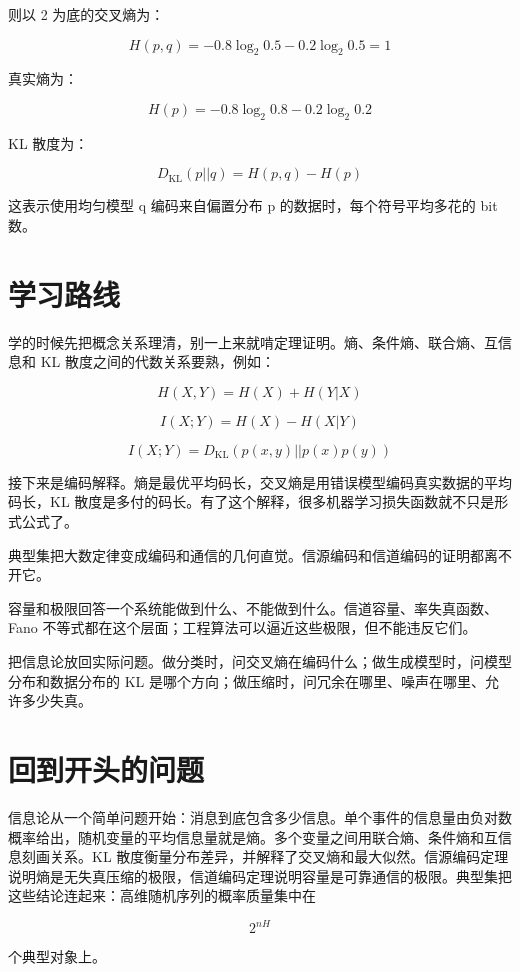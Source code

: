 则以 2 为底的交叉熵为：

\[
H(p,q)=-0.8\log_2 0.5-0.2\log_2 0.5=1
\]

真实熵为：

\[
H(p)=-0.8\log_2 0.8-0.2\log_2 0.2
\]

KL 散度为：

\[
D_{\mathrm{KL}}(p||q)=H(p,q)-H(p)
\]

这表示使用均匀模型 q 编码来自偏置分布 p 的数据时，每个符号平均多花的 bit 数。

\section{学习路线}

学的时候先把概念关系理清，别一上来就啃定理证明。熵、条件熵、联合熵、互信息和 KL 散度之间的代数关系要熟，例如：

\[
H(X,Y)=H(X)+H(Y|X)
\]

\[
I(X;Y)=H(X)-H(X|Y)
\]

\[
I(X;Y)=D_{\mathrm{KL}}(p(x,y)||p(x)p(y))
\]

接下来是编码解释。熵是最优平均码长，交叉熵是用错误模型编码真实数据的平均码长，KL 散度是多付的码长。有了这个解释，很多机器学习损失函数就不只是形式公式了。

典型集把大数定律变成编码和通信的几何直觉。信源编码和信道编码的证明都离不开它。

容量和极限回答一个系统能做到什么、不能做到什么。信道容量、率失真函数、Fano 不等式都在这个层面；工程算法可以逼近这些极限，但不能违反它们。

把信息论放回实际问题。做分类时，问交叉熵在编码什么；做生成模型时，问模型分布和数据分布的 KL 是哪个方向；做压缩时，问冗余在哪里、噪声在哪里、允许多少失真。

\section{回到开头的问题}

信息论从一个简单问题开始：消息到底包含多少信息。单个事件的信息量由负对数概率给出，随机变量的平均信息量就是熵。多个变量之间用联合熵、条件熵和互信息刻画关系。KL 散度衡量分布差异，并解释了交叉熵和最大似然。信源编码定理说明熵是无失真压缩的极限，信道编码定理说明容量是可靠通信的极限。典型集把这些结论连起来：高维随机序列的概率质量集中在

\[
2^{nH}
\]

个典型对象上。
